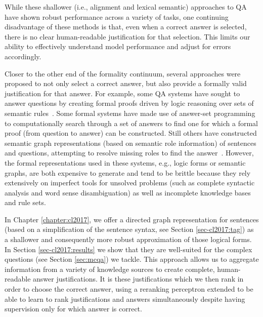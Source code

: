 While these shallower (i.e., alignment and lexical semantic) approaches to QA have shown robust performance across a variety of tasks, one continuing disadvantage of these methods is that, even when a correct answer is selected, there is no clear human-readable justification for that selection.  This limits our ability to effectively understand model performance and adjust for errors accordingly.

Closer to the other end of the formality continuum, several approaches were proposed to not only select a correct answer, but also provide a formally valid justification for that answer.  For example, some QA systems have sought to answer questions by creating formal proofs driven by logic reasoning over sets of semantic rules~\citep[e.g.,][]{moldovan2003cogex,moldovan2007cogex,
balduccini2008knowledge,
maccartney2009natural,liang2013learning,
lewis2013combining}.
Some formal systems have made use of answer-set programming \citep{baral2006using,baral2011towards,baral2012answering,
baral2012knowledge} to computationally search through a set of answers to find one for which a formal proof (from question to answer) can be constructed. 
Still others have constructed semantic graph representations (based on semantic role information) of sentences and questions, attempting to resolve missing roles to find the answer~\citep[e.g.,][]{banarescu2012amr,sharmatowards}. 
However, the formal representations used in these systems, e.g., logic forms or semantic graphs, are both expensive to generate and tend to be brittle because they rely extensively on imperfect tools for unsolved problems (such as complete syntactic analysis and word sense disambiguation) as well as incomplete knowledge bases and rule sets.  %

In Chapter \ref{chapter:cl2017}, we offer a directed graph representation for sentences (based on a simplification of the sentence syntax, see Section \ref{sec-cl2017:tag}) as a shallower and consequently more robust approximation of those logical forms. 
In Section \ref{sec-cl2017:results} we show that they are well-suited for the complex questions (see Section \ref{sec:mcqa}) we tackle.
This approach allows us to aggregate information from a variety of knowledge sources to create complete, human-readable answer justifications.  
It is these justifications which we then rank in order to choose the correct answer, using a reranking perceptron extended to be able to learn to rank justifications and answers simultaneously despite having supervision only for which answer is correct.

